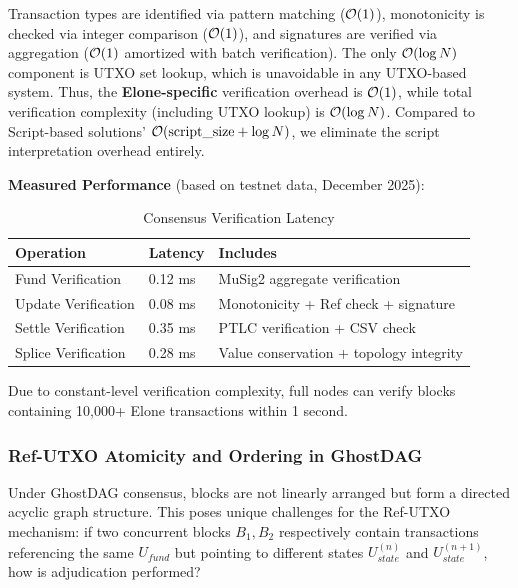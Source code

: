 Transaction types are identified via pattern matching ($\mathcal{O}(1)$), monotonicity is checked via integer comparison ($\mathcal{O}(1)$), and signatures are verified via aggregation ($\mathcal{O}(1)$ amortized with batch verification). The only $\mathcal{O}(\log N)$ component is UTXO set lookup, which is unavoidable in any UTXO-based system. Thus, the \textbf{Elone-specific} verification overhead is $\mathcal{O}(1)$, while total verification complexity (including UTXO lookup) is $\mathcal{O}(\log N)$. Compared to Script-based solutions' $\mathcal{O}(\text{script\_size} + \log N)$, we eliminate the script interpretation overhead entirely.

\textbf{Measured Performance} (based on testnet data, December 2025):

\begin{table}[htbp]
\centering
\small
\caption{Consensus Verification Latency}
\begin{tabular}{@{}lll@{}}
\toprule
\textbf{Operation} & \textbf{Latency} & \textbf{Includes} \\
\midrule
Fund Verification & 0.12 ms & MuSig2 aggregate verification \\
Update Verification & 0.08 ms & Monotonicity + Ref check + signature \\
Settle Verification & 0.35 ms & PTLC verification + CSV check \\
Splice Verification & 0.28 ms & Value conservation + topology integrity \\
\bottomrule
\end{tabular}
\end{table}

\begin{corollary}[Scalability]
Due to constant-level verification complexity, full nodes can verify blocks containing 10,000+ Elone transactions within 1 second.
\end{corollary}

\subsubsection{Ref-UTXO Atomicity and Ordering in GhostDAG}

Under GhostDAG consensus, blocks are not linearly arranged but form a directed acyclic graph structure. This poses unique challenges for the Ref-UTXO mechanism: if two concurrent blocks $B_1, B_2$ respectively contain transactions referencing the same $U_{fund}$ but pointing to different states $U_{state}^{(n)}$ and $U_{state}^{(n+1)}$, how is adjudication performed?

